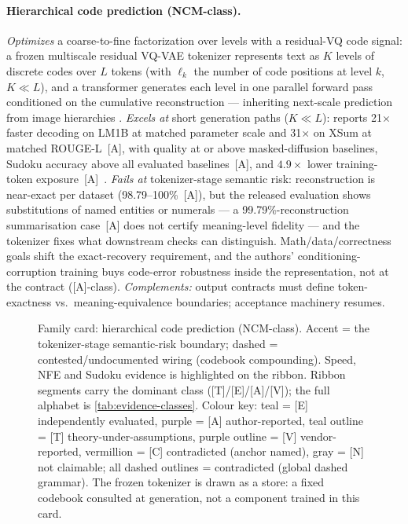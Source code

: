 \documentclass[11pt]{article}
\newcommand{\evaurep}[1]{#1~\textsf{[A]}}     %
\begin{document}
\paragraph{Hierarchical code prediction (NCM-class).}
\textit{Optimizes} a coarse-to-fine factorization over levels with a residual-VQ code signal: a frozen multiscale residual VQ-VAE tokenizer
represents text as $K$ levels of discrete codes over $L$ tokens (with $\ell_k$ the number of
code positions at level $k$, $K \ll L$), and a
transformer generates each level in one parallel forward pass conditioned on the cumulative
reconstruction --- inheriting next-scale prediction from image hierarchies
\cite{kumbong2026ncm}. \textit{Excels at} short generation paths ($K \ll L$):
\evaurep{reports 21$\times$ faster decoding on LM1B at matched parameter scale and 31$\times$ on
XSum at matched ROUGE-L}, with quality at or above masked-diffusion baselines,
\evaurep{Sudoku accuracy above all evaluated baselines}, and \evaurep{$4.9\times$ lower
training-token exposure}~\cite{kumbong2026ncm}.
\textit{Fails at} tokenizer-stage semantic risk: reconstruction is near-exact per dataset (\evaurep{98.79--100\%}), but the released evaluation shows
substitutions of named entities or numerals --- a \evaurep{99.79\%-reconstruction summarisation case}
does not certify meaning-level fidelity --- and the tokenizer fixes
what downstream checks can distinguish. Math/data/correctness goals shift the exact-recovery
requirement, and the authors' conditioning-corruption training buys code-error robustness inside
the representation, not at the contract ([A]-class). \textit{Complements:} output contracts must define token-exactness vs.\
meaning-equivalence boundaries; acceptance machinery resumes.

\begin{figure}[t]\centering
  \resizebox{\linewidth}{!}{}
  \caption{Family card: hierarchical code prediction (NCM-class). Accent = the tokenizer-stage semantic-risk boundary; dashed = contested/undocumented wiring (codebook compounding). Speed, NFE and Sudoku evidence is highlighted on the ribbon. Ribbon segments carry the dominant class ([T]/[E]/[A]/[V]); the full alphabet is \cref{tab:evidence-classes}. Colour key: teal = [E] independently evaluated, purple = [A] author-reported, teal outline = [T] theory-under-assumptions, purple outline = [V] vendor-reported, vermillion = [C] contradicted (anchor named), gray = [N] not claimable; all dashed outlines = contradicted (global dashed grammar). The frozen tokenizer is drawn as a store: a fixed codebook consulted at generation, not a component trained in this card.}
  \label{fig:fam-ncm}
\end{figure}
\end{document}
